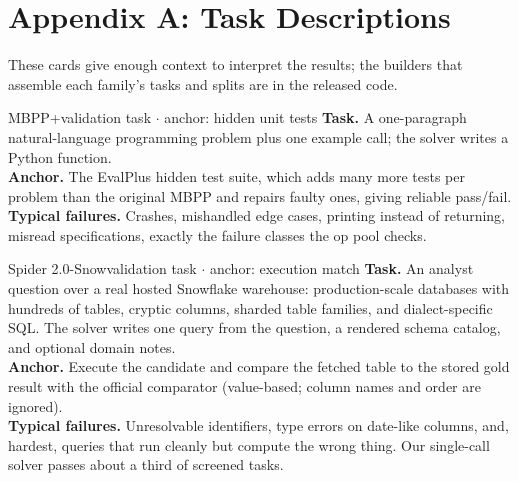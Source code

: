 \documentclass[letterpaper]{article} %
\newcommand{\cardsub}[1]{\hfill{\normalfont\footnotesize\color{inkmut}#1}}
\begin{document}


\clearpage
\appendix

\section{Appendix A: Task Descriptions}
\label{app:tasks}

These cards give enough context to interpret the results; the builders that assemble each family's tasks and splits are in the released code.

\begin{taskbox}{MBPP+\cardsub{validation task $\cdot$ anchor: hidden unit tests}}
\small
\textbf{Task.} A one-paragraph natural-language programming problem plus one example call; the solver writes a Python function.\\[2pt]
\textbf{Anchor.} The EvalPlus hidden test suite, which adds many more tests per problem than the original MBPP and repairs faulty ones, giving reliable pass/fail.\\[2pt]
\textbf{Typical failures.} Crashes, mishandled edge cases, printing instead of returning, misread specifications, exactly the failure classes the op pool checks.
\end{taskbox}

\begin{taskbox}{Spider 2.0-Snow\cardsub{validation task $\cdot$ anchor: execution match}}
\small
\textbf{Task.} An analyst question over a real hosted Snowflake warehouse: production-scale databases with hundreds of tables, cryptic columns, sharded table families, and dialect-specific SQL. The solver writes one query from the question, a rendered schema catalog, and optional domain notes.\\[2pt]
\textbf{Anchor.} Execute the candidate and compare the fetched table to the stored gold result with the official comparator (value-based; column names and order are ignored).\\[2pt]
\textbf{Typical failures.} Unresolvable identifiers, type errors on date-like columns, and, hardest, queries that run cleanly but compute the wrong thing. Our single-call solver passes about a third of screened tasks.
\end{taskbox}
\end{document}
